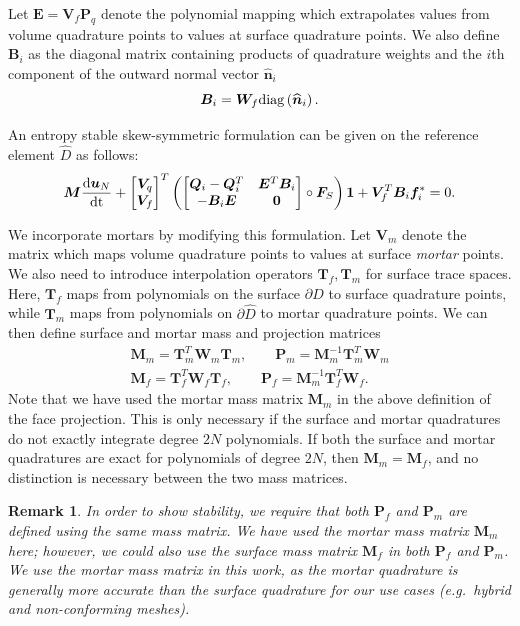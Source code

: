 \documentclass[review]{siamart0216}
\newtheorem*{remark}{Remark}
\renewcommand{\hat}{\widehat}
\newcommand{\td}[2]{\frac{{\rm d}#1}{{\rm d}{\rm #2}}}
\newcommand{\LRp}[1]{\left( #1 \right)}
\newcommand{\diag}[1]{{\rm diag}\LRp{#1}}
\begin{document}
Let $\bm{E} = \bm{V}_f\bm{P}_q$ denote the polynomial mapping which extrapolates values from volume quadrature points to values at surface quadrature points.  We also define $\bm{B}_i$ as the diagonal matrix containing products of quadrature weights and the $i$th component of the outward normal vector $\hat{\bm{n}}_i$
\[
\bm{B}_i = \bm{W}_f \diag{\hat{\bm{n}}_i}.
\]

An entropy stable skew-symmetric formulation can be given on the reference element $\hat{D}$ as follows:
\[
\bm{M}\td{\bm{u}_N}{t} + \begin{bmatrix} \bm{V}_q \\ \bm{V}_f \end{bmatrix}^T
\LRp{\begin{bmatrix}
\bm{Q}_i-\bm{Q}_i^T & \bm{E}^T\bm{B}_i\\
-\bm{B}_i\bm{E} & \bm{0}
\end{bmatrix} \circ \bm{F}_S}\bm{1} + \bm{V}_f^T\bm{B}_i\bm{f}_i^* = 0.  
\]

We incorporate mortars by modifying this formulation.  Let $\bm{V}_m$ denote the matrix which maps volume quadrature points to values at surface \textit{mortar} points.  We also need to introduce interpolation operators $\bm{T}_f, \bm{T}_m$ for surface trace spaces.  Here, $\bm{T}_f$ maps from polynomials on the surface $\partial \hat{D}$ to surface quadrature points, while $\bm{T}_m$ maps from polynomials on $\partial \hat{D}$ to mortar quadrature points.  We can then define surface and mortar mass and projection matrices
\begin{align*}
\bm{M}_m = \bm{T}_m^T\bm{W}_m\bm{T}_m, \qquad \bm{P}_m = \bm{M}_m^{-1}\bm{T}_m^T\bm{W}_m\\
\bm{M}_f = \bm{T}_f^T\bm{W}_f\bm{T}_f, \qquad \bm{P}_f = \bm{M}_m^{-1}\bm{T}_f^T\bm{W}_f.
\end{align*}
Note that we have used the mortar mass matrix $\bm{M}_m$ in the above definition of the face projection.  This is only necessary if the surface and mortar quadratures do not exactly integrate degree $2N$ polynomials.  If both the surface and mortar quadratures are exact for polynomials of degree $2N$, then $\bm{M}_m = \bm{M}_f$, and no distinction is necessary between the two mass matrices.  

\begin{remark}
In order to show stability, we require that both $\bm{P}_f$ and $\bm{P}_m$ are defined using the same mass matrix.  We have used the mortar mass matrix $\bm{M}_m$ here; however, we could also use the surface mass matrix $\bm{M}_f$ in both $\bm{P}_f$ and $\bm{P}_m$.  We use the mortar mass matrix in this work, as the mortar quadrature is generally more accurate than the surface quadrature for our use cases (e.g.\ hybrid and non-conforming meshes).  
\end{remark}
\end{document}
